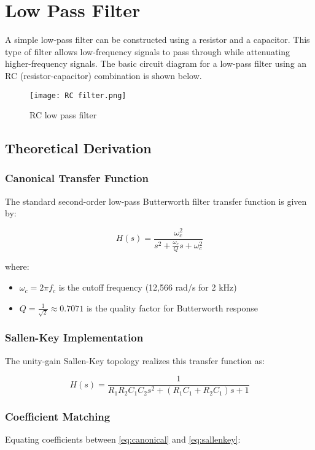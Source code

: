 \documentclass[conference]{IEEEtran}
\begin{document}
\section{Low Pass Filter}
A simple low-pass filter can be constructed using a resistor and a capacitor. This type of filter allows low-frequency signals to pass through while attenuating higher-frequency signals. The basic circuit diagram for a low-pass filter using an RC (resistor-capacitor) combination is shown below.

\begin{figure}[H]
    \centering
    \texttt{[image: RC filter.png]}
    \caption{RC low pass filter}
\end{figure}

\subsection{Theoretical Derivation}

\subsubsection{Canonical Transfer Function}
The standard second-order low-pass Butterworth filter transfer function is given by:

\begin{equation}
H(s) = \frac{\omega_c^2}{s^2 + \frac{\omega_c}{Q}s + \omega_c^2}
\label{eq:canonical}
\end{equation}

where:
\begin{itemize}
\item $\omega_c = 2\pi f_c$ is the cutoff frequency (12,566 rad/s for 2 kHz)
\item $Q = \frac{1}{\sqrt{2}} \approx 0.7071$ is the quality factor for Butterworth response
\end{itemize}

\subsubsection{Sallen-Key Implementation}
The unity-gain Sallen-Key topology realizes this transfer function as:

\begin{equation}
H(s) = \frac{1}{R_1R_2C_1C_2s^2 + (R_1C_1 + R_2C_1)s + 1}
\label{eq:sallenkey}
\end{equation}

\subsubsection{Coefficient Matching}
Equating coefficients between \eqref{eq:canonical} and \eqref{eq:sallenkey}:
\end{document}
